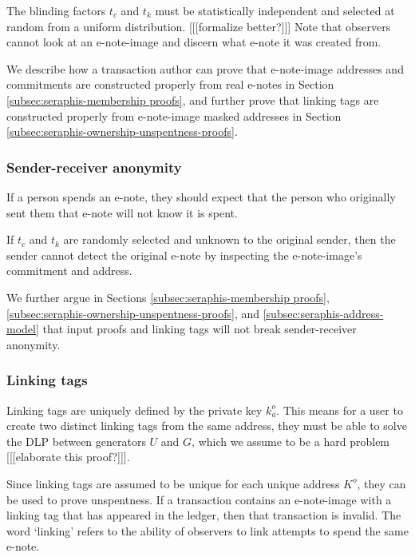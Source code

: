 The blinding factors $t_c$ and $t_k$ must be statistically independent and selected at random from a uniform distribution. [[[formalize better?]]] Note that observers cannot look at an e-note-image and discern what e-note it was created from.

We describe how a transaction author can prove that e-note-image addresses and commitments are constructed properly from real e-notes in Section \ref{subsec:seraphis-membership proofs}, and further prove that linking tags are constructed properly from e-note-image masked addresses in Section \ref{subsec:seraphis-ownership-unspentness-proofs}.

\subsubsection{Sender-receiver anonymity}
\label{subsubsec:e-note-images-sender-receiver-anonymity}

If a person spends an e-note, they should expect that the person who originally sent them that e-note will not know it is spent.

If $t_c$ and $t_k$ are randomly selected and unknown to the original sender, then the sender cannot detect the original e-note by inspecting the e-note-image's commitment and address.

We further argue in Sections \ref{subsec:seraphis-membership proofs}, \ref{subsec:seraphis-ownership-unspentness-proofs}, and \ref{subsec:seraphis-address-model} that input proofs and linking tags will not break sender-receiver anonymity.

\subsubsection{Linking tags}
\label{subsubsec:e-note-images-linking-tags}

Linking tags are uniquely defined by the private key $k^o_a$. This means for a user to create two distinct linking tags from the same address, they must be able to solve the DLP between generators $U$ and $G$, which we assume to be a hard problem [[[elaborate this proof?]]].

Since linking tags are assumed to be unique for each unique address $K^o$, they can be used to prove unspentness. If a transaction contains an e-note-image with a linking tag that has appeared in the ledger, then that transaction is invalid. The word `linking' refers to the ability of observers to link attempts to spend the same e-note.

